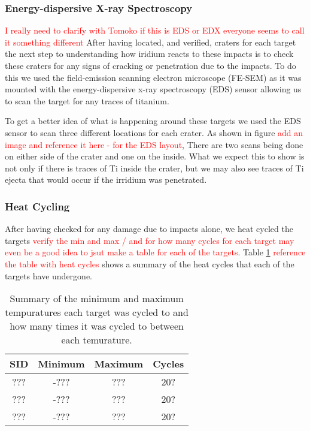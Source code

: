 \documentclass[review]{elsarticle}
\begin{document}
			\subsubsection{Energy-dispersive X-ray Spectroscopy} 
			\textcolor{red}{I really need to clarify with Tomoko if this is EDS or EDX everyone seems to call it something different}
			After having located, and verified, craters for each target the next step to understanding how iridium reacts to these impacts is to check these craters for any
			signs of cracking or penetration due to the impacts. To do this we used the field-emission scanning electron microscope (FE-SEM) as it was mounted with the energy-dispersive
			x-ray spectroscopy (EDS) sensor allowing us to scan the target for any traces of titanium.

			To get a better idea of what is happening around these targets we used the EDS sensor to scan three different locations for each crater. As shown in figure
			\textcolor{red}{add an image and reference it here - for the EDS layout}, There are two scans being done on either side of the crater and one on the inside. What 
			we expect this to show is not only if there is traces of Ti inside the crater, but we may also see traces of Ti ejecta that would occur if the irridium was 
			penetrated. 

			\subsubsection{Heat Cycling}
			After having checked for any damage due to impacts alone, we heat cycled the targets \textcolor{red}{verify the min and max / and for how many cycles for each target
			may even be a good idea to jsut make a table for each of the targets}. Table \ref{tab: heatCycles} \textcolor{red}{reference the table with heat cycles} 
			shows a summary of the heat cycles that each of the targets have undergone. 

			\begin{table}
				\begin{center}
					\begin{tabular}{c|c|c|c}
					SID		& Minimum & Maximum & Cycles \\\hline
					???		& -???	  & ???		& 20?	 \\\hline
					???		& -???	  & ???		& 20?	 \\\hline
					???		& -???	  & ???		& 20?	 \\

					\end{tabular}
				\end{center}
			\caption
			{
				\label{tab: heatCycles}
				Summary of the minimum and maximum tempuratures each target was cycled to and how many times it was cycled to between each temurature.
			}
			\end{table}
\end{document}
